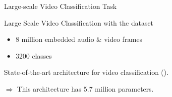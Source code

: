 \begin{frame}{Large-scale Video Classification Task}

  \begin{block}{Large Scale Video Classification with the \yt dataset}
    \begin{itemize}
      \item 8 million embedded audio \& video frames
      \item 3200 classes
    \end{itemize}
  \end{block}

  State-of-the-art architecture for video classification ({}).
  \begin{figure}[htb]
    \scalebox{0.65}{}
  \end{figure}
  $\Rightarrow$ This architecture has 5.7 million parameters.

\end{frame}



